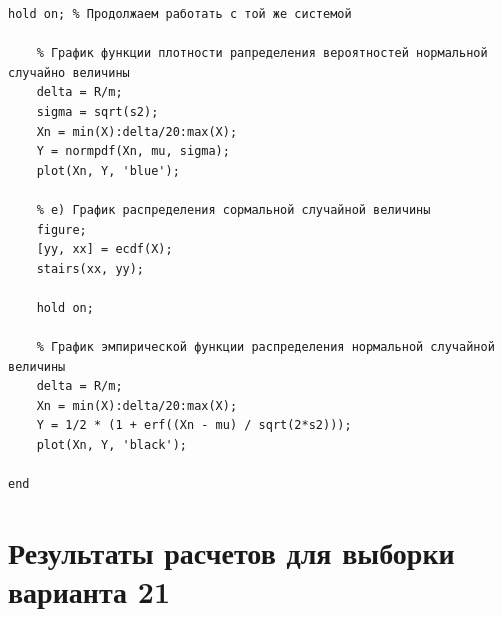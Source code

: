 \documentclass[a4paper,oneside,12pt]{extreport}
\theoremstyle{indented}
\begin{document}
\begin{lstlisting}[caption=Реализация]
    hold on; % Продолжаем работать с той же системой
    
    % График функции плотности рапределения вероятностей нормальной случайно величины
    delta = R/m;
    sigma = sqrt(s2);
    Xn = min(X):delta/20:max(X);
    Y = normpdf(Xn, mu, sigma);
    plot(Xn, Y, 'blue');
    
    % е) График распределения сормальной случайной величины
    figure;
    [yy, xx] = ecdf(X);
    stairs(xx, yy);
    
    hold on;
    
    % График эмпирической функции распределения нормальной случайной величины
    delta = R/m;
    Xn = min(X):delta/20:max(X);
    Y = 1/2 * (1 + erf((Xn - mu) / sqrt(2*s2))); 
    plot(Xn, Y, 'black');
    
end
\end{lstlisting}

\section{Результаты расчетов для выборки варианта 21} 
\end{document}
